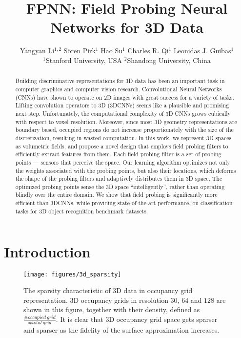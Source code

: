 \documentclass{article}
\title{FPNN: Field Probing Neural Networks for 3D Data}
\author{
	Yangyan Li$^{1,2}$ \hspace{0.1in}
	S\"oren Pirk$^{1}$ \hspace{0.1in}
	Hao Su$^{1}$ \hspace{0.1in}
	Charles R. Qi$^{1}$ \hspace{0.1in}
	Leonidas J. Guibas$^{1}$ \vspace{0.05in} \\
	$^{1}$Stanford University, USA \hspace{0.4in} $^{2}$Shandong University, China
	\vspace{-0.2cm}
}
\begin{document}
\maketitle

\vspace{-0.6cm}
\begin{abstract}
\vspace{-0.4cm}
Building discriminative representations for 3D data has been an important task in computer graphics and computer vision research. Convolutional Neural Networks (CNNs) have shown to operate on 2D images with great success for a variety of tasks. Lifting convolution operators to 3D (3DCNNs) seems like a plausible and promising next step. Unfortunately, the computational complexity of 3D CNNs grows cubically with respect to voxel resolution. Moreover, since most 3D geometry representations are boundary based, occupied regions do not increase proportionately with the size of the discretization, resulting in wasted computation. In this work, we represent 3D spaces as volumetric fields, and propose a novel design that employs field probing filters to efficiently extract features from them. Each field probing filter is a set of probing points --- sensors that perceive the space. Our learning algorithm optimizes not only the weights associated with the probing points, but also their locations, which deforms the shape of the probing filters and adaptively distributes them in 3D space. The optimized probing points sense the 3D space ``intelligently'', rather than operating blindly over the entire domain. We show that field probing is significantly more efficient than 3DCNNs, while providing state-of-the-art performance, on classification tasks for 3D object recognition benchmark datasets.
\end{abstract}
 \vspace{-0.6cm}
\section{Introduction}
\label{sec:introduction}

\vspace{-0.2cm}

\begin{wrapfigure}{R}{0.5\linewidth}
	\vspace{-2.0cm}
	\begin{center}
		\texttt{[image: figures/3d\_sparsity]}
	\end{center}
	\vspace{-0.5cm}
	\caption{The sparsity characteristic of 3D data in occupancy grid representation. 3D occupancy grids in resolution $30$, $64$ and $128$ are shown in this figure, together with their density, defined as $\frac{\#occupied~grid}{\#total~grid}$. It is clear that 3D occupancy grid space gets sparser and sparser as the fidelity of the surface approximation increases.}
	\label{fig:3d_sparsity}
	\vspace{-0.3cm}
\end{wrapfigure}
\end{document}
